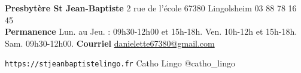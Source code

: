 \begin{framed}
\textbf{Presbytère St Jean-Baptiste}
	2 rue de l'école 67380 Lingolsheim 03 88 78 16 45 \\
\textbf{Permanence} Lun. au Jeu. : 09h30-12h00 et 15h-18h. Ven. 10h-12h et 15h-18h. Sam. 09h30-12h00.
\textbf{Courriel} \href{mailto:danielette67380@gmail.com}{danielette67380@gmail.com}


\texttt{https://stjeanbaptistelingo.fr} \hfill \faFacebook Catho Lingo \hfill \faInstagram @catho\_lingo
\end{framed}

